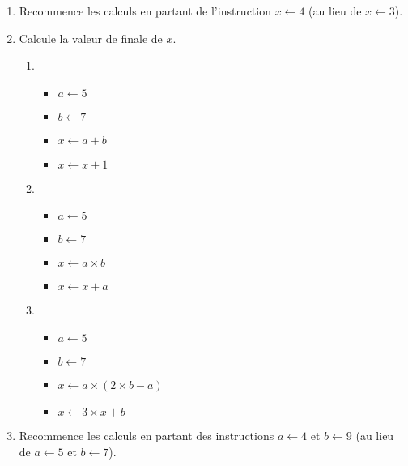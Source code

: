 \documentclass[class=report,crop=false, 12pt]{standalone}
\begin{document}
\begin{activite}
\begin{enumerate}
  \item Recommence les calculs en partant de l'instruction $x \leftarrow 4$ (au lieu de $x \leftarrow 3$).
 
 
  \item Calcule la valeur de finale de $x$.
  
  \begin{enumerate}
    \item
    \begin{itemize}
      \item $a \leftarrow 5$
      \item $b \leftarrow 7$
      \item $x \leftarrow a + b$
      \item $x \leftarrow x + 1$
    \end{itemize}
    
    \item 
    \begin{itemize}
      \item $a \leftarrow 5$   
      \item $b \leftarrow 7$
      \item $x \leftarrow a \times b$
      \item $x \leftarrow x + a$
    \end{itemize}
    
    \item
    \begin{itemize}
      \item $a \leftarrow 5$   
      \item $b \leftarrow 7$
      \item $x \leftarrow a \times (2 \times b - a)$
      \item $x \leftarrow 3 \times x + b$
    \end{itemize}
    
  \end{enumerate}  
  
  \item Recommence les calculs en partant des instructions 
$a \leftarrow 4$ et $b \leftarrow 9$ (au lieu de $a \leftarrow 5$ et $b \leftarrow 7$).   
  
\end{enumerate}
 
\end{activite}
\end{document}
